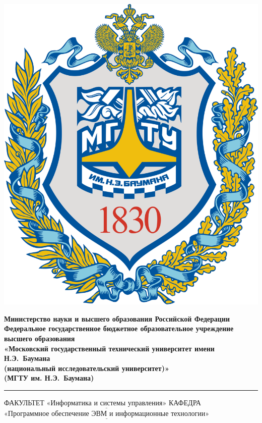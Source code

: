 \thispagestyle{empty}

\noindent \begin{minipage}{0.15\textwidth}
	\includegraphics[width=\linewidth]{img/b_logo}
\end{minipage}
\noindent\begin{minipage}{0.85\textwidth}\centering
	\textbf{Министерство науки и высшего образования Российской Федерации}\\
	\textbf{Федеральное государственное бюджетное образовательное учреждение высшего образования}\\
	\textbf{«Московский государственный технический университет имени Н.Э.~Баумана}\\
	\textbf{(национальный исследовательский университет)»}\\
	\textbf{(МГТУ им. Н.Э.~Баумана)}
\end{minipage}

\noindent\rule{\linewidth}{3pt}
\newline\newline
\noindent ФАКУЛЬТЕТ $\underline{\text{«Информатика и системы управления»}}$ \newline\newline
\noindent КАФЕДРА $\underline{\text{«Программное обеспечение ЭВМ и информационные технологии»}}$

